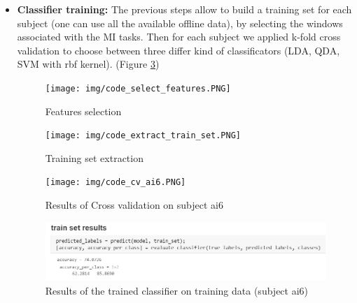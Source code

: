 \begin{itemize}
\begin{figure}[h!]
	 \caption{Fisher Score Average on 3 runs and filtered with Features weights (Figure \ref{fig:features_filter}) (16x23) (subject ai6)}
	 \label{fig:fisher_score_avg_filtered_ai6}
\end{figure}



\item \textbf{Classifier training:} The previous steps allow to build a training set for each subject (one can use all the available offline data), by selecting the windows associated with the MI tasks. Then for each subject we applied k-fold cross validation to choose between three differ kind of classificators (LDA, QDA, SVM with rbf kernel). (Figure \ref{fig:cv_ai6})\\

\begin{figure}[h!]
	\begin{center}
		 \texttt{[image: img/code\_select\_features.PNG]}
	\end{center}

	 \caption{Features selection}
	 \label{fig:features_selection}


	\begin{center}
		 \texttt{[image: img/code\_extract\_train\_set.PNG]}
	\end{center}

	 \caption{Training set extraction}
	 \label{fig:train_set_extraction}
\end{figure}

\begin{figure}[h!]
	\begin{center}
		 \texttt{[image: img/code\_cv\_ai6.PNG]}
	\end{center}

	 \caption{Results of Cross validation on subject ai6}
	 \label{fig:cv_ai6}
\end{figure}

\begin{figure}[h!]
	\begin{center}
		 \includegraphics[width=0.7\linewidth]{img/code_train_set_results_ai6.PNG}
	\end{center}

	 \caption{Results of the trained classifier on training data (subject ai6)}
	 \label{fig:train_results_ai6}
\end{figure}



\end{itemize}
